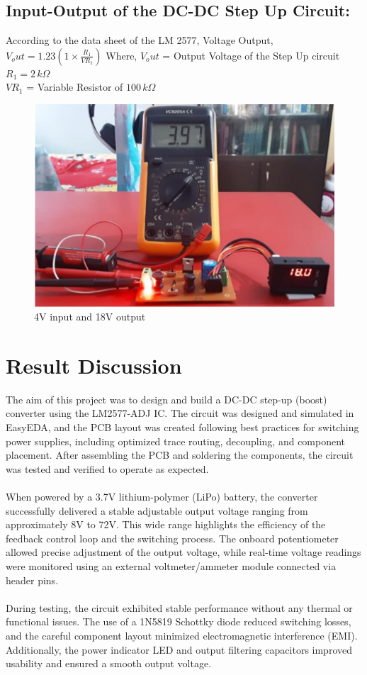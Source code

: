 \documentclass[12pt]{article}
\begin{document}
\subsection*{Input-Output of the DC-DC Step Up Circuit:}
According to the data sheet of the LM 2577,
Voltage Output, \( V_out = 1.23 \left( 1 \times
\frac{R_1}{VR_1} \right) \)
Where,
\( V_out \) = Output Voltage of the Step Up circuit \\
\( R_1 = 2 \, k\Omega \) \\
\( VR_1 \) = Variable Resistor of \( 100 \, k\Omega \)

\begin{figure}[H]
    \centering
    \includegraphics[width=.5\textwidth]{pr.png}
    \caption{4V input and 18V output}
\end{figure}

\section*{Result Discussion}
The aim of this project was to design and build a DC-DC step-up (boost) converter using the LM2577-ADJ IC. The circuit was designed and simulated in EasyEDA, and the PCB layout was created following best practices for switching power supplies, including optimized trace routing, decoupling, and component placement. After assembling the PCB and soldering the components, the circuit was tested and verified to operate as expected.\\\\
When powered by a 3.7V lithium-polymer (LiPo) battery, the converter successfully delivered a stable adjustable output voltage ranging from approximately 8V to 72V. This wide range highlights the efficiency of the feedback control loop and the switching process. The onboard potentiometer allowed precise adjustment of the output voltage, while real-time voltage readings were monitored using an external voltmeter/ammeter module connected via header pins.\\\\
During testing, the circuit exhibited stable performance without any thermal or functional issues. The use of a 1N5819 Schottky diode reduced switching losses, and the careful component layout minimized electromagnetic interference (EMI). Additionally, the power indicator LED and output filtering capacitors improved usability and ensured a smooth output voltage.
\end{document}
